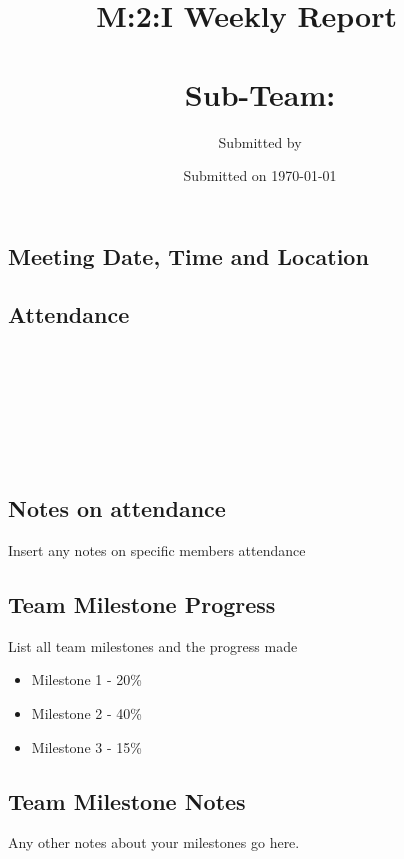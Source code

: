 \documentclass[10pt,a4paper]{article}
\author{Submitted by \teamLeader}
\title{M:2:I Weekly Report \ \\ \teamName \ \\ Sub-Team: \subteamName}
\date{Submitted on \today}
\begin{document}
\maketitle

\begin{Form}
\begin{framed}
\section*{Meeting Date, Time and Location}
\TextField[name=meetinginfo,width=9cm,charsize=12pt]
{\mbox{}}
\end{framed}
\begin{framed}
\section*{Attendance}
 \ \\ \ \\
\TextField[name=attend2,width=16.85cm,charsize=12pt]\ \\ \ \\
 \ \\ \ \\
\subsection*{Notes on attendance}
Insert any notes on specific members attendance
\end{framed}
\begin{framed}
\section*{Team Milestone Progress}
List all team milestones and the progress made
\begin{itemize}
\item Milestone 1 - 20\%
\item Milestone 2 - 40\%
\item Milestone 3 - 15\%
\end{itemize}
\subsection*{Team Milestone Notes}
Any other notes about your milestones go here.
\end{framed}
\begin{framed}

\end{framed}
\end{Form}
\end{document}
